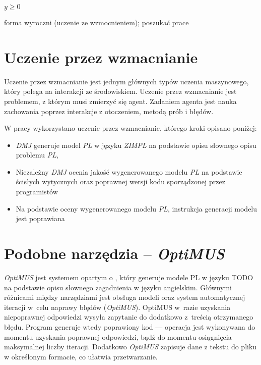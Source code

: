     $y \geq 0$

forma wyroczni (uczenie ze wzmocnieniem); poszukać prace

\section{Uczenie przez wzmacnianie}


Uczenie przez wzmacnianie jest jednym głównych typów uczenia maszynowego, który polega na interakcji ze środowiskiem. Uczenie przez wzmacnianie jest problemem, z którym musi zmierzyć się agent. Zadaniem agenta jest nauka zachowania poprzez interakcje z otoczeniem, metodą prób i błędów.\cite{kaelbling1996reinforcement}

W pracy wykorzystano uczenie przez wzmacnianie, którego kroki opisano poniżej:
\begin{itemize}
    \item \textit{DMJ} generuje model \textit{PL} w języku \textit{ZIMPL} na podstawie opisu słownego opisu problemu \textit{PL},
    \item Niezależny \textit{DMJ} ocenia jakość wygenerowanego modelu \textit{PL} na podstawie ścisłych wytycznych oraz poprawnej wersji kodu sporządzonej przez programistów
    \item Na podstawie oceny wygenerowanego modelu \textit{PL}, instrukcja generacji modelu jest poprawiana
\end{itemize}

\section{Podobne narzędzia -- \textit{OptiMUS}} \label{sec:optimus}

\textit{OptiMUS} \cite{ahmaditeshnizi2023optimus} jest systemem opartym o , który generuje modele PL w języku TODO na podstawie opisu słownego zagadnienia w języku angielskim. %
Głównymi różnicami między narzędziami jest obsługa modeli  oraz system automatycznej iteracji w~celu naprawy błędów (\textit{OptiMUS}). %
OptiMUS w~razie uzyskania niepoprawnej odpowiedzi wysyła zapytanie do  dodatkowo z~treścią otrzymanego błędu. %
Program generuje wtedy poprawiony kod --- operacja jest wykonywana do momentu uzyskania poprawnej odpowiedzi, bądź do momentu osiągnięcia maksymalnej liczby iteracji. Dodatkowo \textit{OptiMUS} zapisuje dane z tekstu do pliku w określonym formacie, co ułatwia przetwarzanie. %



